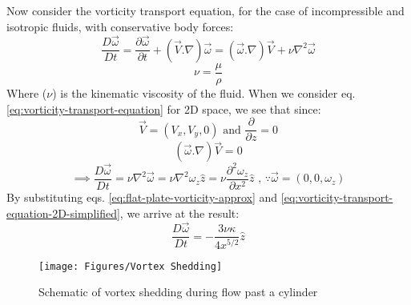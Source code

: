 Now consider the vorticity transport equation, for the case of incompressible and isotropic fluids, with conservative body forces:
\begin{equation}
	\frac{D \vec{\omega}}{D t} = \frac{\partial \vec{\omega}}{\partial t} + (\vec{V}.\nabla)\vec{\omega} = (\vec{\omega}.\nabla)\vec{V} + \nu \nabla^2 \vec{\omega} 
	\label{eq:vorticity-transport-equation}
\end{equation}
\begin{equation}
	\nu = \frac{\mu}{\rho}
\end{equation}
Where ($\nu$) is the kinematic viscosity of the fluid.
When we consider eq. \ref{eq:vorticity-transport-equation} for 2D space, we see that since:
\begin{equation}
	\vec{V} = (V_x, V_y, 0) \text{ and } \frac{\partial}{\partial z} = 0
\end{equation}
\begin{equation}
	(\vec{\omega}.\nabla)\vec{V} = 0
\end{equation}
\begin{equation}
	\implies \frac{D \vec{\omega}}{D t} = \nu \nabla^2 \vec{\omega} = \nu\nabla^2 \omega_z \hat{z} = \nu \frac{\partial^2 \omega_z}{\partial x^2} \hat{z} \text{ , } \because \vec{\omega} = (0, 0, \omega_z)
	\label{eq:vorticity-transport-equation-2D-simplified}
\end{equation}
By substituting eqs. \ref{eq:flat-plate-vorticity-approx} and \ref{eq:vorticity-transport-equation-2D-simplified}, we arrive at the result:
\begin{equation}
	 \frac{D \vec{\omega}}{D t} = - \frac{3 \nu \kappa}{4 x^{5/2}} \hat{z}
	 \label{eq:omega-dot-flat-plate}
\end{equation}

\begin{figure}[H]
	\centering
	\texttt{[image: Figures/Vortex Shedding]}
	\caption{Schematic of vortex shedding during flow past a cylinder}
	\label{fig:vortex-shedding}
\end{figure}

